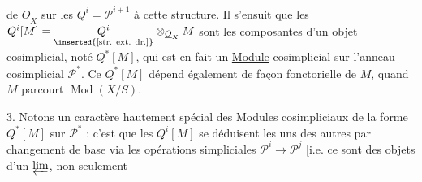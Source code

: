 de $\underline O_X$ sur les $Q^i=\mathcal P^{i+1}$  à cette structure. Il s'ensuit que les
$Q^i[M]=\underset{\inserted{\text{[str. ext. dr.]}}}{Q^i}\otimes_{\underline O_X}M$
sont les composantes d'un objet cosimplicial, noté $Q^*[M]$, qui est en fait un \uline{Module} cosimplicial sur l'anneau cosimplicial $\mathcal P^*$.
Ce $Q^*[M]$ dépend également de façon fonctorielle de $M$, quand $M$ parcourt $\operatorname{Mod}(X/S)$.

3. Notons un caractère hautement spécial des Modules cosimpliciaux de la forme $Q^*[M]$ sur $\mathcal P^*$ :   c'est que les $Q^i[M]$ se déduisent les uns des autres par changement de base via les opérations simpliciales $\mathcal P^i\longrightarrow\mathcal P^j$ [i.e. ce sont des  objets d'un $\varprojlim$, non seulement
